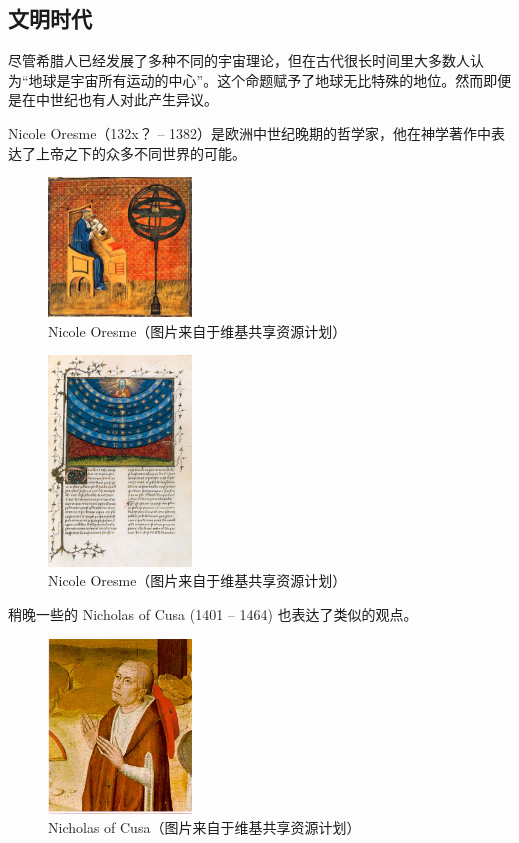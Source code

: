 \documentclass[a4paper,10.5pt]{article}
\begin{document}
\newpage

\subsection{文明时代}

尽管希腊人已经发展了多种不同的宇宙理论，但在古代很长时间里大多数人认为“地球是宇宙所有运动的中心”。这个命题赋予了地球无比特殊的地位。然而即便是在中世纪也有人对此产生异议。

Nicole Oresme（132x？ – 1382）是欧洲中世纪晚期的哲学家，他在神学著作中表达了上帝之下的众多不同世界的可能。

\begin{figure}[ht]
\centering
\includegraphics[width=1.5in]{images/1_02-Oresme.jpg}
\caption{Nicole Oresme（图片来自于维基共享资源计划）}
\end{figure}

\begin{figure}[ht]
\centering
\includegraphics[width=1.5in]{images/1_03-Oresme_Spheres.jpg}
\caption{Nicole Oresme（图片来自于维基共享资源计划）}
\end{figure}

稍晚一些的 Nicholas of Cusa  (1401 – 1464) 也表达了类似的观点。

\begin{figure}[ht]
\centering
\includegraphics[width=1.5in]{images/1_04-Nicholas_of_Cusa.jpg}
\caption{Nicholas of Cusa（图片来自于维基共享资源计划）}
\end{figure}
\end{document}
